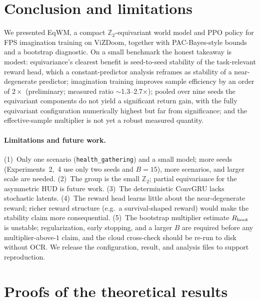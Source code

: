\documentclass[preprint,12pt]{elsarticle}
\begin{document}
\section{Conclusion and limitations}\label{sec:concl}
We presented EqWM, a compact $\mathbb Z_2$-equivariant world model and PPO
policy for FPS imagination training on ViZDoom, together with PAC-Bayes-style
bounds and a bootstrap diagnostic. On a small benchmark the honest takeaway
is modest: equivariance's clearest benefit is seed-to-seed stability of the
task-relevant reward head, which a constant-predictor analysis reframes as
stability of a near-degenerate predictor; imagination training improves
sample efficiency by an order of $2\times$ (preliminary; measured ratio
$\sim$1.3--2.7$\times$); pooled over nine seeds the equivariant components do
not yield a significant return gain, with the fully equivariant configuration
numerically highest but far from significance; and the effective-sample
multiplier is not yet a robust measured quantity.

\paragraph{Limitations and future work.}
(1)~Only one scenario (\texttt{health\_gathering}) and a small model; more
seeds (Experiments~2,~4 use only two seeds and $B=15$), more scenarios, and
larger scale are needed. (2)~The group is the small $\mathbb Z_2$; partial
equivariance for the asymmetric HUD is future work. (3)~The deterministic
ConvGRU lacks stochastic latents. (4)~The reward head learns little about the
near-degenerate reward; richer reward structure (e.g.\ a survival-shaped
reward) would make the stability claim more consequential. (5)~The bootstrap
multiplier estimate $R_{\rm boot}$ is unstable; regularization, early
stopping, and a larger $B$ are required before any multiplier-above-$1$
claim, and the cloud cross-check should be re-run to disk without OCR. We
release the configuration, result, and analysis files to support reproduction.

\appendix
\section{Proofs of the theoretical results}\label{app:proofs}
\end{document}
